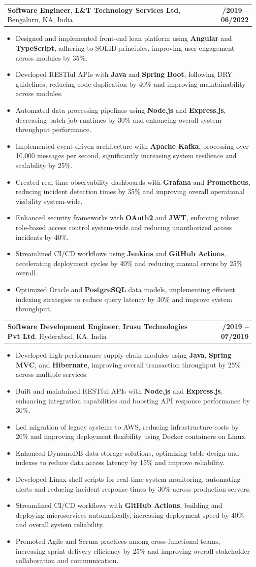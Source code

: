\documentclass[letterpaper,11pt]{article}
\makeatletter
\newcommand{\resumeItem}[1]{
  \item\footnotesize{
    {#1 \vspace{-2pt}}
  }
}
\newcommand{\resumeSubheading}[4]{
  \vspace{-2pt}\item
    \begin{tabular*}{1.0\textwidth}[t]{l@{\extracolsep{\fill}}r}
      \textbf{\fontsize{10pt}{14pt}\selectfont #3}, \textbf{\fontsize{10pt}{14pt}\selectfont #1}, \fontsize{10pt}{14pt}\selectfont #4 & \textbf{\fontsize{10pt}{14pt}\selectfont #2} \\
    \end{tabular*}\vspace{-7pt}
}
\newcommand{\resumeItemListStart}{\begin{itemize}[leftmargin=*]}
\newcommand{\resumeItemListEnd}{\end{itemize}\vspace{-5pt}}
\makeatother
\begin{document}
    \resumeSubheading
        {L\&T Technology Services Ltd}{08/2019 -- 06/2022}
        {Software Engineer}{Bengaluru, KA, India}
      \resumeItemListStart
        \resumeItem{Designed and implemented front-end loan platform using \textbf{Angular} and \textbf{TypeScript}, adhering to SOLID principles, improving user engagement across modules by 35\%.}
        \resumeItem{Developed RESTful APIs with \textbf{Java} and \textbf{Spring Boot}, following DRY guidelines, reducing code duplication by 40\% and improving maintainability across modules.}
        \resumeItem{Automated data processing pipelines using \textbf{Node.js} and \textbf{Express.js}, decreasing batch job runtimes by 30\% and enhancing overall system throughput performance.}
        \resumeItem{Implemented event-driven architecture with \textbf{Apache Kafka}, processing over 10,000 messages per second, significantly increasing system resilience and scalability by 25\%.}
        \resumeItem{Created real-time observability dashboards with \textbf{Grafana} and \textbf{Prometheus}, reducing incident detection times by 35\% and improving overall operational visibility system-wide.}
        \resumeItem{Enhanced security frameworks with \textbf{OAuth2} and \textbf{JWT}, enforcing robust role-based access control system-wide and reducing unauthorized access incidents by 40\%.}
        \resumeItem{Streamlined CI/CD workflows using \textbf{Jenkins} and \textbf{GitHub Actions}, accelerating deployment cycles by 40\% and reducing manual errors by 25\% overall.}
        \resumeItem{Optimized Oracle and \textbf{PostgreSQL} data models, implementing efficient indexing strategies to reduce query latency by 30\% and improve system throughput.}
      \resumeItemListEnd

    \resumeSubheading
        {Irusu Technologies Pvt Ltd}{01/2019 -- 07/2019}
        {Software Development Engineer}{Hyderabad, KA, India}
      \resumeItemListStart
        \resumeItem{Developed high-performance supply chain modules using \textbf{Java}, \textbf{Spring MVC}, and \textbf{Hibernate}, improving overall transaction throughput by 25\% across multiple services.}
        \resumeItem{Built and maintained RESTful APIs with \textbf{Node.js} and \textbf{Express.js}, enhancing integration capabilities and boosting API response performance by 30\%.}
        \resumeItem{Led migration of legacy systems to AWS, reducing infrastructure costs by 20\% and improving deployment flexibility using Docker containers on Linux.}
        \resumeItem{Enhanced DynamoDB data storage solutions, optimizing table design and indexes to reduce data access latency by 15\% and improve reliability.}
        \resumeItem{Developed Linux shell scripts for real-time system monitoring, automating alerts and reducing incident response times by 30\% across production servers.}
        \resumeItem{Streamlined CI/CD workflows with \textbf{GitHub Actions}, building and deploying microservices automatically, increasing deployment speed by 40\% and overall system reliability.}
        \resumeItem{Promoted Agile and Scrum practices among cross-functional teams, increasing sprint delivery efficiency by 25\% and improving overall stakeholder collaboration and communication.}
      \resumeItemListEnd
\end{document}
